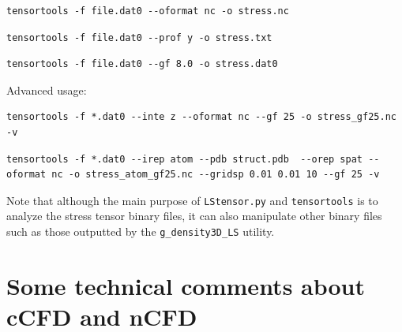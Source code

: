 \documentclass[10pt,letterpaper,notitlepage]{article}
\begin{document}
\begin{lstlisting}[caption={Conversion to NETCDF format}]
tensortools -f file.dat0 --oformat nc -o stress.nc
\end{lstlisting}

\begin{lstlisting}[caption={Compute a stress profile along the y axis and save it to a text file}]
tensortools -f file.dat0 --prof y -o stress.txt
\end{lstlisting}

\begin{lstlisting}[caption={Smooth data using a gaussian kernel with a standard deviation of 8 (in units of the grid spacing)}]
tensortools -f file.dat0 --gf 8.0 -o stress.dat0
\end{lstlisting}

Advanced usage:

\begin{lstlisting}[caption={Read the IKN stress from *.dat0 files, integrate out the z direction, smooth the data with a Gaussian filter of 25 (units of the grid size), and write the result in the file stress\_gf25.nc}]
tensortools -f *.dat0 --inte z --oformat nc --gf 25 -o stress_gf25.nc -v
\end{lstlisting}

\begin{lstlisting}[caption={Read the stress per atom from *.dat0 files, load the PDB structure from struct.pdb, translate the data to a grid with spacing 0.01, 0.01, 10, apply a Gaussian filter of 25 and store the result in stress\_atom\_gf25.nc}]
tensortools -f *.dat0 --irep atom --pdb struct.pdb  --orep spat --oformat nc -o stress_atom_gf25.nc --gridsp 0.01 0.01 10 --gf 25 -v
\end{lstlisting}

Note that although the main purpose of \texttt{LStensor.py} and \texttt{tensortools} is to analyze the stress tensor binary files, it can also manipulate other binary files such as those outputted by the \texttt{g\_density3D\_LS} utility. 

\section{Some technical comments about cCFD and nCFD}
\end{document}
